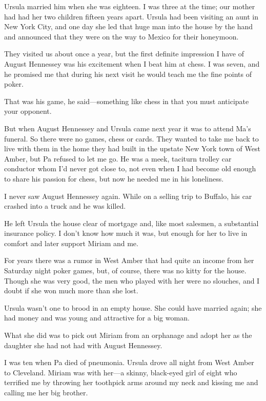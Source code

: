 \documentclass{novel}
\begin{document}
Ursula married him when she was eighteen. I was three at the time; our mother had had her two children fifteen years apart. Ursula had been visiting an aunt in New York City, and one day she led that huge man into the house by the hand and announced that they were on the way to Mexico for their honeymoon.

They visited us about once a year, but the first definite impression I have of August Hennessey was his excitement when I beat him at chess. I was seven, and he promised me that during his next visit he would teach me the fine points of poker.

That was his game, he said—something like chess in that you must anticipate your opponent.

But when August Hennessey and Ursula came next year it was to attend Ma’s funeral. So there were no games, chess or cards. They wanted to take me back to live with them in the home they had built in the upstate New York town of West Amber, but Pa refused to let me go. He was a meek, taciturn trolley car conductor whom I’d never got close to, not even when I had become old enough to share his passion for chess, but now he needed me in his loneliness.

I never saw August Hennessey again. While on a selling trip to Buffalo, his car crashed into a truck and he was killed.

He left Ursula the house clear of mortgage and, like most salesmen, a substantial insurance policy. I don’t know how much it was, but enough for her to live in comfort and later support Miriam and me. 

For years there was a rumor in West Amber that had quite an income from her Saturday night poker games, but, of course, there was no kitty for the house. Though she was very good, the men who played with her were no slouches, and I doubt if she won much more than she lost.

Ursula wasn’t one to brood in an empty house. She could have married again; she had money and was young and attractive for a big woman. 

What she did was to pick out Miriam from an orphanage and adopt her as the daughter she had not had with August Hennessey.

I was ten when Pa died of pneumonia. Ursula drove all night from West Amber to Cleveland. Miriam was with her—a skinny, black-eyed girl of eight who terrified me by throwing her toothpick arms around my neck and kissing me and calling me her big brother.
\end{document}
